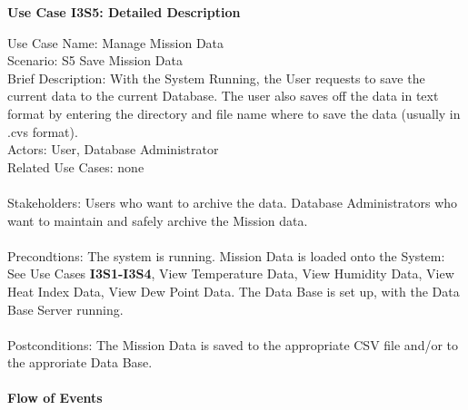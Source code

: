 \documentclass[letterpaper]{article}
\begin{document}
\noindent
\begin{center}
\textbf{Use Case I3S5:  Detailed Description}
\end{center}
Use Case Name:  Manage Mission Data\\
Scenario:  S5 Save Mission Data\\
Brief Description:  With the System Running, the User requests to
save the current data to the current Database. The user also saves off
the data in text format by entering the directory and file name where
to save the data (usually in .cvs format).\\
Actors:  User, Database Administrator\\
Related Use Cases:  none\\\\
Stakeholders:  Users who want to archive the data.  Database
Administrators who want to maintain and safely archive the Mission
data.\\\\
Precondtions:  The system is running.  Mission Data is loaded onto the
System:  See Use Cases \textbf{I3S1-I3S4}, View Temperature Data,
View Humidity Data, View Heat Index Data, View Dew Point Data. The
Data Base is set up, with the Data Base Server running.\\\\
Postconditions:  The Mission Data is saved to the appropriate CSV file
and/or to the approriate Data Base.\\\\
\textbf{Flow of Events}\\\\
\end{document}
